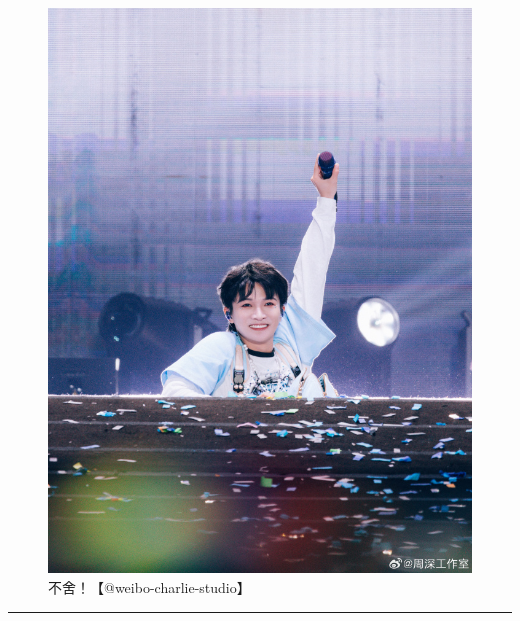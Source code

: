 \documentclass[]{ctexbook}
\begin{document}
\begin{figure}

{\centering \includegraphics[width=400pt]{img/suzhou20241110/003} 

}

\caption{不舍！【@weibo-charlie-studio】}\label{fig:unnamed-chunk-137}
\end{figure}

\begin{center}\rule{0.5\linewidth}{0.5pt}\end{center}
\end{document}
